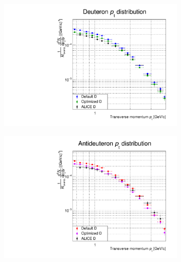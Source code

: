 \begin{figure}[h]
    \centering
    \begin{subfigure}{.49\textwidth}
    \centering
        \includegraphics[width=\textwidth]{image/3-risultati/analyse/G/def_opt_deuteron.pdf}
        \caption{}
        \label{fig:def_opt_deuteron}
    \end{subfigure}
    \begin{subfigure}{.49\textwidth}
        \centering
        \includegraphics[width=\textwidth]{image/3-risultati/analyse/G/def_opt_antideuteron.pdf}
        \caption{}
        \label{fig:def_opt_antideuteron}
    \end{subfigure}
    \label{fig:def_opt}
\end{figure}